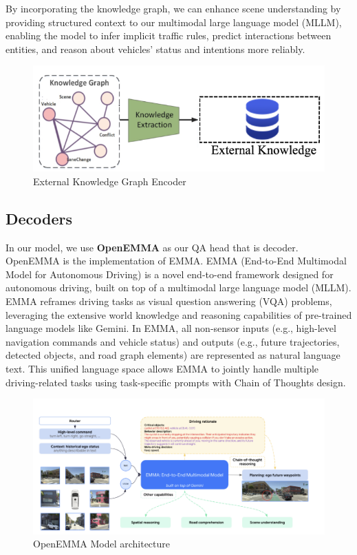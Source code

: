 \documentclass{article} %
\begin{document}
	By incorporating the knowledge graph, we can enhance scene understanding by providing structured context to our multimodal large language model (MLLM), enabling the model to infer implicit traffic rules, predict interactions between entities, and reason about vehicles' status and intentions more reliably.
	\begin{figure}[H]
		\centering
		\includegraphics[width=0.55\linewidth]{Figures/knowledge_graph.png}
		\caption{External Knowledge Graph Encoder}
		\label{fig:ekg}
	\end{figure}
	
	
	
	
	\subsection{ Decoders }
	In our model, we use \textbf{OpenEMMA}\cite{Xing2024OpenEMMAOM} as our QA head that is decoder. OpenEMMA is the implementation of EMMA\cite{Hwang2024EMMAEM}. EMMA (End-to-End Multimodal Model for Autonomous Driving) is a novel end-to-end framework designed for autonomous driving, built on top of a multimodal large language model (MLLM). EMMA reframes driving tasks as visual question answering (VQA) problems, leveraging the extensive world knowledge and reasoning capabilities of pre-trained language models like Gemini. In EMMA, all non-sensor inputs (e.g., high-level navigation commands and vehicle status) and outputs (e.g., future trajectories, detected objects, and road graph elements) are represented as natural language text. This unified language space allows EMMA to jointly handle multiple driving-related tasks using task-specific prompts with Chain of Thoughts design.
	
	\begin{figure}[H]
		\centering
		\includegraphics[width=0.9\linewidth]{Figures/EMMA Framework.png}
		\caption{OpenEMMA Model architecture}
		\label{fig:EMMA}
	\end{figure}
	
\end{document}
